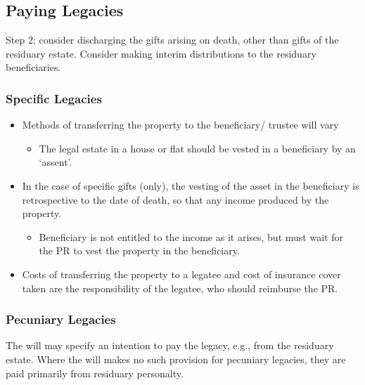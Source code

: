 \documentclass[
]{article}
\providecommand{\tightlist}{%
  \setlength{\itemsep}{0pt}\setlength{\parskip}{0pt}}
\begin{document}
\hypertarget{paying-legacies}{%
\subsection{Paying Legacies}\label{paying-legacies}}

Step 2; consider discharging the gifts arising on death, other than
gifts of the residuary estate. Consider making interim distributions to
the residuary beneficiaries.

\hypertarget{specific-legacies}{%
\subsubsection{Specific Legacies}\label{specific-legacies}}

\begin{itemize}
\tightlist
\item
  Methods of transferring the property to the beneficiary/ trustee will
  vary

  \begin{itemize}
  \tightlist
  \item
    The legal estate in a house or flat should be vested in a
    beneficiary by an `assent'.
  \end{itemize}
\item
  In the case of specific gifts (only), the vesting of the asset in the
  beneficiary is retrospective to the date of death, so that any income
  produced by the property.

  \begin{itemize}
  \tightlist
  \item
    Beneficiary is not entitled to the income as it arises, but must
    wait for the PR to vest the property in the beneficiary.
  \end{itemize}
\item
  Costs of transferring the property to a legatee and cost of insurance
  cover taken are the responsibility of the legatee, who should
  reimburse the PR.
\end{itemize}

\hypertarget{pecuniary-legacies}{%
\subsubsection{Pecuniary Legacies}\label{pecuniary-legacies}}

The will may specify an intention to pay the legacy, e.g., from the
residuary estate. Where the will makes no such provision for pecuniary
legacies, they are paid primarily from residuary personalty.
\end{document}
